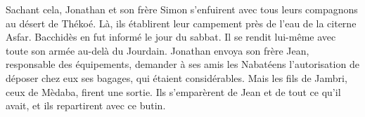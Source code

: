Sachant cela, Jonathan et son frère Simon s’enfuirent avec tous leurs compagnons
		au désert de Thékoé.
Là, ils établirent leur campement près de l’eau de la citerne Asfar.
Bacchidès en fut informé le jour du sabbat.
	Il se rendit lui-même avec toute son armée au-delà du Jourdain.
Jonathan envoya son frère Jean, responsable des équipements,
	demander à ses amis les Nabatéens l’autorisation de déposer chez eux ses bagages,
		qui étaient considérables.
Mais les fils de Jambri, ceux de Mèdaba, firent une sortie.
	Ils s’emparèrent de Jean et de tout ce qu’il avait, et ils repartirent avec ce butin.
